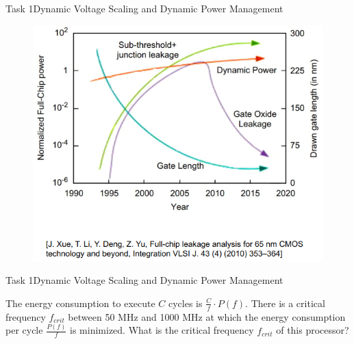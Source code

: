 \begin{frame}{Task 1}{Dynamic Voltage Scaling and Dynamic Power Management}
    \begin{solution}
    \begin{figure}
        \centering
        \includegraphics[scale=0.4]{figures/gateLeakages.PNG}
    \end{figure}
    \end{solution}
\end{frame}
\begin{frame}{Task 1}{Dynamic Voltage Scaling and Dynamic Power Management}
    \begin{tasknoinc}
    The energy consumption to execute $C$ cycles is $\frac{C}{f} \cdot P(f)$. There is a critical frequency $f_{crit}$ between 50 MHz and 1000 MHz at which the energy consumption per cycle $\frac{P(f)}{f}$ is minimized. What is the critical frequency $f_{crit}$ of this processor?
    \end{tasknoinc}
\end{frame}
